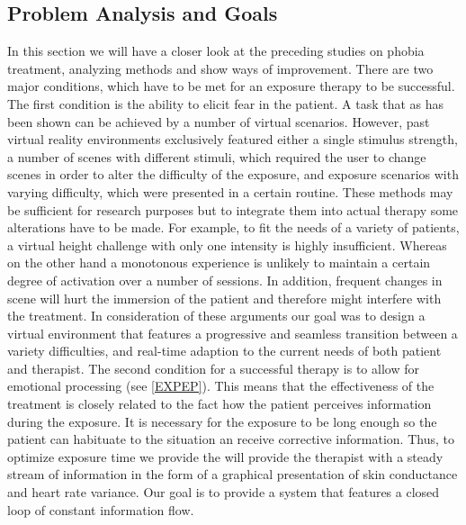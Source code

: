 \subsection{Problem Analysis and Goals}
In this section we will have a closer look at the preceding studies on phobia treatment, analyzing methods and show ways of improvement.
There are two major conditions, which have to be met for an exposure therapy to be successful. The first condition is the ability to elicit fear in the patient. A task that as has been shown can be achieved by a number of virtual scenarios. However, past virtual reality environments exclusively featured either a single stimulus strength, a number of scenes with different stimuli, which required the user to change scenes in order to alter the difficulty of the exposure, and exposure scenarios with varying difficulty, which were presented in a certain routine. These methods may be sufficient for research purposes but to integrate them into actual therapy some alterations have to be made. For example, to fit the needs of a variety of patients, a virtual height challenge with only one intensity is highly insufficient. Whereas on the other hand a monotonous experience is unlikely to maintain a certain degree of activation over a number of sessions. In addition, frequent changes in scene will hurt the immersion of the patient and therefore might interfere with the treatment. In consideration of these arguments our goal was to design a virtual environment that features a progressive and seamless transition between a variety difficulties, and real-time adaption to the current needs of both patient and therapist. The second condition for a successful therapy is to allow for emotional processing (see \ref{EXPEP}). This means that the effectiveness of the treatment is closely related to the fact how the patient perceives information during the exposure. It is necessary for the exposure to be long enough so the patient can habituate to the situation an receive corrective information. Thus, to optimize exposure time we provide the will provide the therapist with a steady stream of information in the form of a graphical presentation of skin conductance and heart rate variance. Our goal is to provide a system that features a closed loop of constant information flow.



